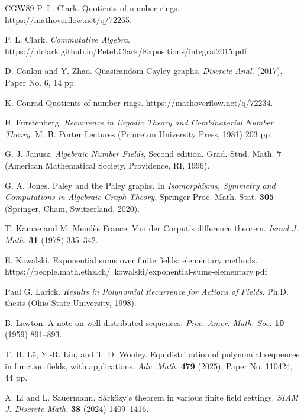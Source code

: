 \documentclass{amsart}
\theoremstyle{definition}
\numberwithin{equation}{section}
\begin{document}
\begin{thebibliography}{CGW89}
P. L. Clark.
\newblock   Quotients of number rings.
\newblock   https://mathoverflow.net/q/72265.

P. L. Clark.
\newblock   \emph{Commutative Algebra}.
\newblock   https://plclark.github.io/PeteLClark/Expositions/integral2015.pdf

D. Conlon and Y. Zhao.
\newblock   Quasirandom Cayley graphs.
\newblock   \emph{Discrete Anal.} (2017), Paper No. 6, 14 pp.

K. Conrad
\newblock   Quotients of number rings.
\newblock   https://mathoverflow.net/q/72234.

H. Furstenberg.
\newblock   \emph{Recurrence in Ergodic Theory and Combinatorial Number Theory}.
\newblock   M. B. Porter Lectures (Princeton University Press, 1981) 203 pp.

G. J. Janusz.
\newblock   \emph{Algebraic Number Fields}, Second edition.
\newblock   Grad. Stud. Math. \textbf{7} (American Mathematical Society, Providence, RI, 1996).

G. A. Jones.
\newblock   Paley and the Paley graphs.
\newblock   In \emph{Isomorphisms, Symmetry and Computations in Algebraic Graph Theory}, Springer Proc. Math. Stat. \textbf{305} (Springer, Cham, Switzerland, 2020).

T. Kamae and M. Mend\`{e}s France.
\newblock	Van der {C}orput's difference theorem.
\newblock	\emph{Israel J. Math.} \textbf{31} (1978) 335--342.

E. Kowalski.
\newblock	Exponential sums over finite fields: elementary methods.
\newblock	https://people.math.ethz.ch/~kowalski/exponential-sums-elementary.pdf

Paul G. Larick.
\newblock \emph{Results in Polynomial Recurrence for Actions of Fields}.
\newblock Ph.D. thesis (Ohio State University, 1998).

B. Lawton.
\newblock   A note on well distributed sequences.
\newblock   \emph{Proc. Amer. Math. Soc.} \textbf{10} (1959) 891--893.

T. H. L\^{e}, Y.-R. Liu, and T. D. Wooley.
\newblock Equidistribution of polynomial sequences in function fields, with applications.
\newblock   \emph{Adv. Math.} \textbf{479} (2025), Paper No. 110424, 44 pp.

A. Li and L. Sauermann.
\newblock	S\'{a}rk\"{o}zy's theorem in various finite field settings.
\newblock	\emph{SIAM J. Discrete Math.} \textbf{38} (2024) 1409--1416.


\end{thebibliography}
\end{document}
